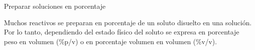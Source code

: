 \documentclass[12pt, aspectratio=169]{beamer}
\begin{document}
\begin{frame}{Preparar soluciones en porcentaje}
	
	Muchos reactivos se preparan en porcentaje de un soluto disuelto en una soluci\'on. Por lo tanto, dependiendo del estado f\'isico del soluto se expresa en porcentaje peso en volumen (\%p/v) o en porcentaje volumen en volumen (\%v/v).

\end{frame}
\end{document}

